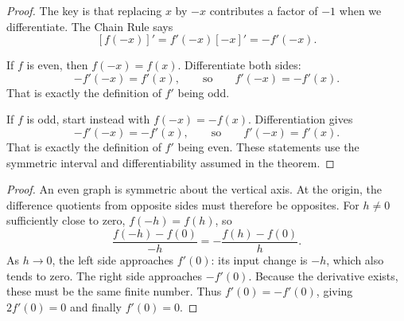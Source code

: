 
\begin{proof}
The key is that replacing $x$ by $-x$ contributes a factor of $-1$
when we differentiate. The Chain Rule says
$$[f(-x)]'=f'(-x)[-x]'=-f'(-x).$$

If $f$ is even, then $f(-x)=f(x)$. Differentiate both sides:
$$-f'(-x)=f'(x),\qquad\text{so}\qquad f'(-x)=-f'(x).$$
That is exactly the definition of $f'$ being odd.

If $f$ is odd, start instead with $f(-x)=-f(x)$. Differentiation gives
$$-f'(-x)=-f'(x),\qquad\text{so}\qquad f'(-x)=f'(x).$$
That is exactly the definition of $f'$ being even.
These statements use the symmetric interval and differentiability
assumed in the theorem.
\end{proof}


\begin{proof}
An even graph is symmetric about the vertical axis. At the origin,
the difference quotients from opposite sides must therefore be opposites.
For $h\ne0$ sufficiently close to zero, $f(-h)=f(h)$, so
$$\frac{f(-h)-f(0)}{-h}
=-\frac{f(h)-f(0)}h.$$
As $h\to0$, the left side approaches $f'(0)$: its input change is $-h$,
which also tends to zero. The right side approaches $-f'(0)$.
Because the derivative exists, these must be the same finite number.
Thus $f'(0)=-f'(0)$, giving $2f'(0)=0$ and finally $f'(0)=0$.
\end{proof}

\label{sec:derivative-applications-proofs}


